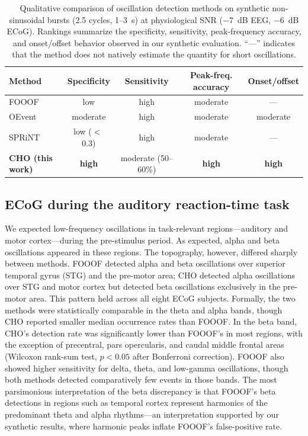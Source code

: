 \documentclass[11pt]{article}
\begin{document}
\begin{table}[t]
\centering
\caption{Qualitative comparison of oscillation detection methods on synthetic non-sinusoidal bursts (2.5 cycles, 1--3~s) at physiological SNR ($-7$~dB EEG, $-6$~dB ECoG). Rankings summarize the specificity, sensitivity, peak-frequency accuracy, and onset/offset behavior observed in our synthetic evaluation. ``---'' indicates that the method does not natively estimate the quantity for short oscillations.}
\label{tab:methods_comparison}
\begin{tabular}{lcccc}
\toprule
Method & Specificity & Sensitivity & Peak-freq. accuracy & Onset/offset \\
\midrule
FOOOF \citep{donoghue2020parameterizing}   & low    & high   & moderate & --- \\
OEvent \citep{neymotin2022oevent}         & moderate & high   & moderate & moderate \\
SPRiNT \citep{wilson2022sprint}           & low ($<$\,0.3) & high & moderate & --- \\
\textbf{CHO (this work)}                  & \textbf{high}    & moderate (50--60\%) & \textbf{high}     & \textbf{high} \\
\bottomrule
\end{tabular}
\end{table}

\subsection{ECoG during the auditory reaction-time task}

We expected low-frequency oscillations in task-relevant regions---auditory and motor cortex---during the pre-stimulus period. As expected, alpha and beta oscillations appeared in these regions. The topography, however, differed sharply between methods. FOOOF detected alpha and beta oscillations over superior temporal gyrus (STG) and the pre-motor area; CHO detected alpha oscillations over STG and motor cortex but detected beta oscillations exclusively in the pre-motor area. This pattern held across all eight ECoG subjects. Formally, the two methods were statistically comparable in the theta and alpha bands, though CHO reported smaller median occurrence rates than FOOOF. In the beta band, CHO's detection rate was significantly lower than FOOOF's in most regions, with the exception of precentral, pars opercularis, and caudal middle frontal areas (Wilcoxon rank-sum test, $p < 0.05$ after Bonferroni correction). FOOOF also showed higher sensitivity for delta, theta, and low-gamma oscillations, though both methods detected comparatively few events in those bands. The most parsimonious interpretation of the beta discrepancy is that FOOOF's beta detections in regions such as temporal cortex represent harmonics of the predominant theta and alpha rhythms---an interpretation supported by our synthetic results, where harmonic peaks inflate FOOOF's false-positive rate.
\end{document}
